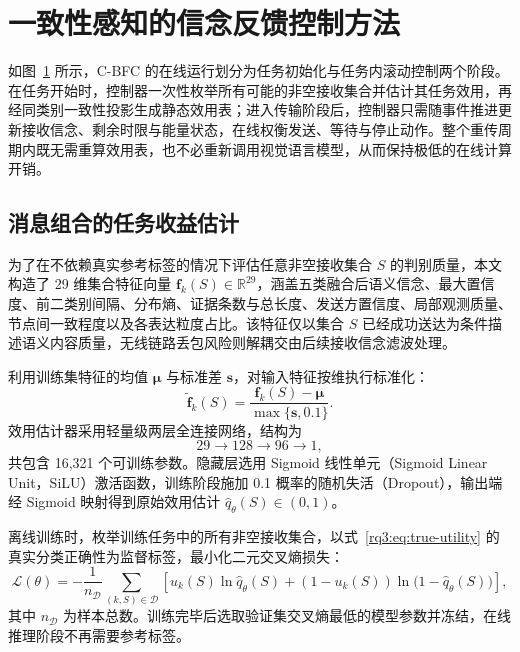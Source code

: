 \section{一致性感知的信念反馈控制方法}
\label{rq3:sec:method}

如图~\ref{rq3:fig:controller} 所示，C-BFC 的在线运行划分为任务初始化与任务内滚动控制两个阶段。在任务开始时，控制器一次性枚举所有可能的非空接收集合并估计其任务效用，再经同类别一致性投影生成静态效用表；进入传输阶段后，控制器只需随事件推进更新接收信念、剩余时限与能量状态，在线权衡发送、等待与停止动作。整个重传周期内既无需重算效用表，也不必重新调用视觉语言模型，从而保持极低的在线计算开销。

\begin{figure}[t]
  \centering
  
  \label{rq3:fig:controller}
\end{figure}

\subsection{消息组合的任务收益估计}
\label{rq3:subsec:utility}

为了在不依赖真实参考标签的情况下评估任意非空接收集合 $S$ 的判别质量，本文构造了 29 维集合特征向量 $\bm f_k(S)\in\mathbb R^{29}$，涵盖五类融合后语义信念、最大置信度、前二类别间隔、分布熵、证据条数与总长度、发送方置信度、局部观测质量、节点间一致程度以及各表达粒度占比。该特征仅以集合 $S$ 已经成功送达为条件描述语义内容质量，无线链路丢包风险则解耦交由后续接收信念滤波处理。

利用训练集特征的均值 $\bm\mu$ 与标准差 $\bm s$，对输入特征按维执行标准化：
\begin{equation}
  \widetilde{\bm f}_k(S)=\frac{\bm f_k(S)-\bm\mu}{\max\{\bm s,0.1\}}.
  \label{rq3:eq:feature-normalization}
\end{equation}
效用估计器采用轻量级两层全连接网络，结构为
\begin{equation}
  29\longrightarrow128\longrightarrow96\longrightarrow1,
  \label{rq3:eq:network-architecture}
\end{equation}
共包含 16,321 个可训练参数。隐藏层选用 Sigmoid 线性单元（Sigmoid Linear Unit，SiLU）激活函数，训练阶段施加 0.1 概率的随机失活（Dropout），输出端经 Sigmoid 映射得到原始效用估计 $\hat q_\theta(S)\in(0,1)$。

离线训练时，枚举训练任务中的所有非空接收集合，以式~\eqref{rq3:eq:true-utility} 的真实分类正确性为监督标签，最小化二元交叉熵损失：
\begin{equation}
  \mathcal L(\theta)=-\frac{1}{n_{\mathcal D}}
  \sum_{(k,S)\in\mathcal D}
  \left[u_k(S)\ln\hat q_\theta(S)
  +(1-u_k(S))\ln\bigl(1-\hat q_\theta(S)\bigr)\right],
  \label{rq3:eq:utility-loss}
\end{equation}
其中 $n_{\mathcal D}$ 为样本总数。训练完毕后选取验证集交叉熵最低的模型参数并冻结，在线推理阶段不再需要参考标签。

